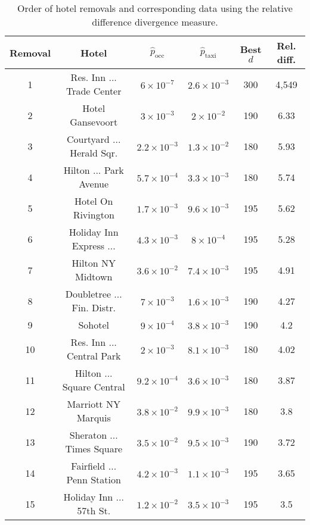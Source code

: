 \documentclass[useAMS, referee, usenatbib]{biom}
\begin{document}
\begin{table}
\caption{Order of hotel removals and corresponding data using the relative difference divergence measure.}
\label{t:relative_divergence}
\begin{center}
 \begin{tabular}{||c|c|c|c|c|c||}
 \hline
 Removal & Hotel & $\hat{p}_{\mathrm{occ}}$ & $\hat{p}_{\mathrm{taxi}}$ & Best $d$ & Rel. diff. \\ [0.5ex] 
 \hline
 1 & Res. Inn ... Trade Center & $6 \times 10^{-7}$ & $2.6 \times 10^{-3}$ & 300 & 4,549 \\
 2 & Hotel Gansevoort & $3 \times 10^{-3}$ & $2 \times 10^{-2}$ & 190 & 6.33 \\
 3 & Courtyard ... Herald Sqr. & $2.2 \times 10^{-3}$ & $1.3 \times 10^{-2}$ & 180 & 5.93 \\
 4 & Hilton ... Park Avenue & $5.7 \times 10^{-4}$ & $3.3 \times 10^{-3}$ & 180 & 5.74 \\
 5 & Hotel On Rivington & $1.7 \times 10^{-3}$ & $9.6 \times 10^{-3}$ & 195 & 5.62 \\
 6 & Holiday Inn Express ... & $4.3 \times 10^{-3}$ & $8 \times 10^{-4}$ & 195 & 5.28 \\
 7 & Hilton NY Midtown & $3.6 \times 10^{-2}$ & $7.4 \times 10^{-3}$ & 195 & 4.91 \\
 8 & Doubletree ... Fin. Distr. & $7 \times 10^{-3}$ & $1.6 \times 10^{-3}$ & 190 & 4.27 \\
 9 & Sohotel & $9 \times 10^{-4}$ & $3.8 \times 10^{-3}$ & 190 & 4.2 \\
 10 & Res. Inn ... Central Park & $2 \times 10^{-3}$ & $8.1 \times 10^{-3}$ & 180 & 4.02 \\
 11 & Hilton ... Square Central & $9.2 \times 10^{-4} $ & $3.6 \times 10^{-3}$ & 180 & 3.87 \\
 12 & Marriott NY Marquis & $3.8 \times 10^{-2}$ & $9.9 \times 10^{-3}$ & 180 & 3.8 \\
 13 & Sheraton ... Times Square & $3.5 \times 10^{-2}$ & $9.5 \times 10^{-3}$ & 190 & 3.72 \\
 14 & Fairfield ... Penn Station & $4.2 \times 10^{-3}$ & $1.1 \times 10^{-3}$ & 195 & 3.65 \\
 15 & Holiday Inn ... 57th St. & $1.2 \times 10^{-2}$ & $3.5 \times 10^{-3}$ & 195 & 3.5 \\
 \hline
\end{tabular}
\end{center}
\end{table}
\end{document}

